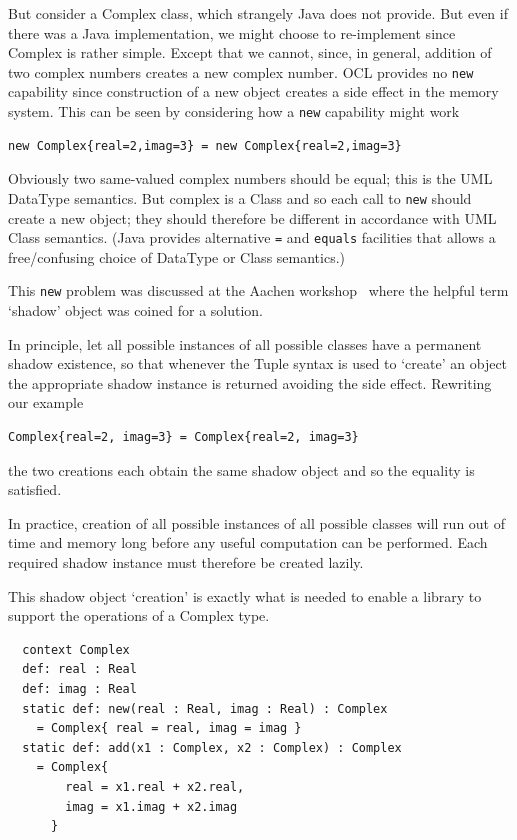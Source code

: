 \documentclass[sigconf]{acmart}
\begin{document}
But consider a Complex class, which strangely Java does not provide. But even if there was a Java implementation, we might choose to re-implement since Complex is rather simple. Except that we cannot, since, in general, addition of two complex numbers creates a new complex number. OCL provides no \verb|new| capability since construction of a new object creates a side effect in the memory system. This can be seen by considering how a \verb|new| capability might work

\begin{verbatim}
new Complex{real=2,imag=3} = new Complex{real=2,imag=3}
\end{verbatim} 

Obviously two same-valued complex numbers should be equal; this is the UML DataType semantics. But complex is a Class and so each call to \verb|new| should create a new object; they should therefore be different in accordance with UML Class semantics. (Java provides alternative \verb|=| and \verb|equals| facilities that allows a free/confusing choice of DataType or Class semantics.)

This \verb|new| problem was discussed at the Aachen workshop~\cite{OCL-Aachen} where the helpful term `shadow' object was coined for a solution.

In principle, let all possible instances of all possible classes have a permanent shadow existence, so that whenever the Tuple syntax is used to `create' an object the appropriate shadow instance is returned avoiding the side effect. Rewriting our example

\begin{verbatim}
Complex{real=2, imag=3} = Complex{real=2, imag=3}
\end{verbatim} 

the two creations each obtain the same shadow object and so the equality is satisfied. 

In practice, creation of all possible instances of all possible classes will run out of time and memory long before any useful computation can be performed. Each required shadow instance must therefore be created lazily. 

This shadow object `creation' is exactly what is needed to enable a library to support the operations of a Complex type.

\begin{verbatim}
  context Complex
  def: real : Real
  def: imag : Real
  static def: new(real : Real, imag : Real) : Complex
    = Complex{ real = real, imag = imag }
  static def: add(x1 : Complex, x2 : Complex) : Complex
    = Complex{
        real = x1.real + x2.real,
        imag = x1.imag + x2.imag
      }
\end{verbatim} 
\end{document}

